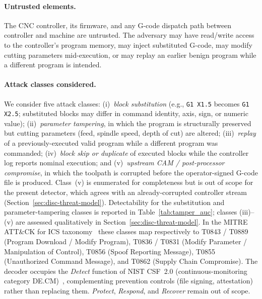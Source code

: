 \documentclass[sensors,article,submit,moreauthors,pdftex]{Definitions/mdpi}
\begin{document}
\paragraph{Untrusted elements.} The CNC controller, its firmware, and any G-code dispatch path between controller and machine are untrusted. The adversary may have read/write access to the controller's program memory, may inject substituted G-code, may modify cutting parameters mid-execution, or may replay an earlier benign program while a different program is intended.

\paragraph{Attack classes considered.} We consider five attack classes: (i)~\emph{block substitution} (e.g., \texttt{G1 X1.5} becomes \texttt{G1 X2.5}; substituted blocks may differ in command identity, axis, sign, or numeric value); (ii)~\emph{parameter tampering}, in which the program is structurally preserved but cutting parameters (feed, spindle speed, depth of cut) are altered; (iii)~\emph{replay} of a previously-executed valid program while a different program was commanded; (iv)~\emph{block skip or duplicate} of executed blocks while the controller log reports nominal execution; and (v)~\emph{upstream CAM / post-processor compromise}, in which the toolpath is corrupted before the operator-signed G-code file is produced. Class~(v) is enumerated for completeness but is out of scope for the present detector, which agrees with an already-corrupted controller stream (Section~\ref{sec:disc-threat-model}). Detectability for the substitution and parameter-tampering classes is reported in Table~\ref{tab:tamper_auc}; classes (iii)--(v) are assessed qualitatively in Section~\ref{sec:disc-threat-model}. In the MITRE ATT\&CK for ICS taxonomy~\cite{mitre_attack_ics} these classes map respectively to T0843 / T0889 (Program Download / Modify Program), T0836 / T0831 (Modify Parameter / Manipulation of Control), T0856 (Spoof Reporting Message), T0855 (Unauthorized Command Message), and T0862 (Supply Chain Compromise). The decoder occupies the \emph{Detect} function of NIST CSF~2.0 (continuous-monitoring category DE.CM)~\cite{nistcsf2}, complementing prevention controls (file signing, attestation) rather than replacing them. \emph{Protect}, \emph{Respond}, and \emph{Recover} remain out of scope.
\end{document}
